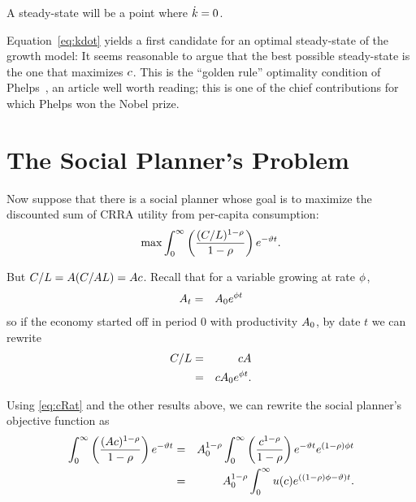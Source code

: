 \documentclass{handout}
\begin{document}
A steady-state will be a point where $\dot{{k}} = 0$.

Equation~\eqref{eq:kdot}  yields a first candidate for an optimal
steady-state of the growth model: It seems reasonable to argue that the best
possible steady-state is the one that maximizes $c$.  This is the
``golden rule'' optimality condition of
Phelps~\cite{phelps:golden}, an article well worth reading; this is
one of the chief contributions for which Phelps won the Nobel prize.

\section{The Social Planner's Problem}

Now suppose that there is a social planner whose goal is to maximize the discounted
sum of CRRA utility from per-capita consumption:
\begin{equation}
  \max \int_{0}^{\infty} \left(\frac{(C/L)^{1-\rho}}{1-\rho}\right) e^{-\vartheta  t} \label{eq:maxprob}.  
\end{equation}

But $C/L = A (C/A L)= A c$.  Recall that for a variable growing at rate $\phi$,
\begin{eqnarray}
  A _{t} & = & A _{0}e^{\phi t}
\end{eqnarray}
so if the economy started off in period 0 with productivity $A_{0}$, by date $t$ we can rewrite
\begin{eqnarray}
  C/L & = & cA   \\
               & = & cA _{0}e^{\phi t}. \label{eq:cRat}
\end{eqnarray}

Using \eqref{eq:cRat} and the other results above, we can rewrite the social planner's objective function as
\begin{eqnarray}
  \int_{0}^{\infty} \left(\frac{(A c)^{1-\rho}}{1-\rho}\right) e^{-\vartheta  t} & = & 
                                                                                               A _{0}^{1-\rho}\int_{0}^{\infty} \left(\frac{c^{1-\rho}}{1-\rho}\right) e^{-\vartheta  t}e^{(1-\rho)\phi  t} 
  \\ & = & A _{0}^{1-\rho}\int_{0}^{\infty} u(c) e^{\left((1-\rho)\phi -\vartheta \right) t}
           .
           \label{eq:maxprobmod}
\end{eqnarray}
\end{document}
